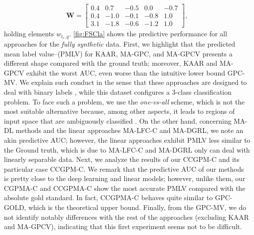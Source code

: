 \documentclass[journal]{IEEEtran}
\providecommand{\mat}[1]{{\bm{#1}}} %
\providecommand{\mat}[1]{{\mathbf{#1}}}
\begin{document}
\begin{align}
\mat{W}=\begin{bmatrix}
0.4  &  0.7   & -0.5 &  0.0  & -0.7\\
0.4   &  -1.0  & -0.1  &  -0.8 & 1.0\\
3.1   &  -1.8  & -0.6  &  -1.2   & 1.0
\end{bmatrix},
\label{eq:parametersPC}
\end{align}
holding elements $w_{l_r,q}$. \cref{fig:FSCla} shows the predictive performance for all approaches for the \textit{fully synthetic} data. First, we highlight that the predicted mean label value--(PMLV) for KAAR, MA-GPC, and MA-GPCV presents a different shape compared with the ground truth; moreover, KAAR and MA-GPCV exhibit the worst AUC, even worse than the intuitive lower bound GPC-MV. We explain such conduct in the sense that these approaches are designed to deal with binary labels \cite{gil2018learning,rodrigues2014gaussian,ruiz2019learning}, while this dataset configures a 3-class classification problem. To face such a problem, we use the \textit{one-vs-all} scheme, which is not the most suitable alternative because, among other aspects, it leads to regions of input space that are ambiguously classified \cite{bishop2006pattern}. On the other hand, concerning MA-DL methods and the linear approaches MA-LFC-C and MA-DGRL, we note an akin predictive AUC; however, the linear approaches exhibit PMLV less similar to the Ground truth, which is due to MA-LFC-C and MA-DGRL only can deal with linearly separable data. Next, we analyze the results of our CCGPM-C and its particular case CCGPM-C. We remark that the predictive AUC of our methods is pretty close to the deep learning and linear models; however, unlike them, our CGPMA-C and CCGPMA-C show the most accurate PMLV compared with the absolute gold standard. In fact, CCGPMA-C behaves quite similar to GPC-GOLD, which is the theoretical upper bound. Finally, from the GPC-MV, we do not identify notably differences with the rest of the approaches (excluding KAAR and MA-GPCV), indicating that this first experiment seems not to be difficult.\\
\end{document}
